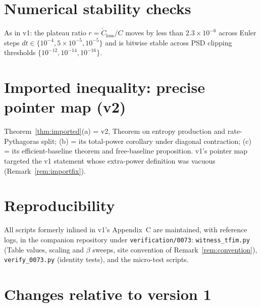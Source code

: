 \documentclass[11pt,a4paper]{article}
\theoremstyle{plain}
\theoremstyle{definition}
\theoremstyle{remark}
\begin{document}
\appendix

\section{Numerical stability checks}

As in v1: the plateau ratio $r = \dot{C}_{\mathrm{loss}}/C$ moves by less
than $2.3\times 10^{-6}$ across Euler steps $dt \in \{10^{-4}, 5\times
10^{-5}, 10^{-5}\}$ and is bitwise stable across PSD clipping thresholds
$\{10^{-12}, 10^{-14}, 10^{-16}\}$.

\section{Imported inequality: precise pointer map (v2)}

Theorem~\ref{thm:imported}(a) = \cite{MaintWork} v2, Theorem on entropy
production and rate-Pythagoras split; (b) = its total-power corollary under
diagonal contraction; (c) = its efficient-baseline theorem and free-baseline
proposition. v1's pointer map targeted the v1 statement whose extra-power
definition was vacuous (Remark~\ref{rem:importfix}).

\section{Reproducibility}

All scripts formerly inlined in v1's Appendix~C are maintained, with
reference logs, in the companion repository under
\texttt{verification/0073}: \texttt{witness\_tfim.py} (Table values, scaling
and $\beta$ sweeps, site convention of Remark~\ref{rem:convention}),
\texttt{verify\_0073.py} (identity tests), and the micro-test scripts.

\section{Changes relative to version 1}
\end{document}
